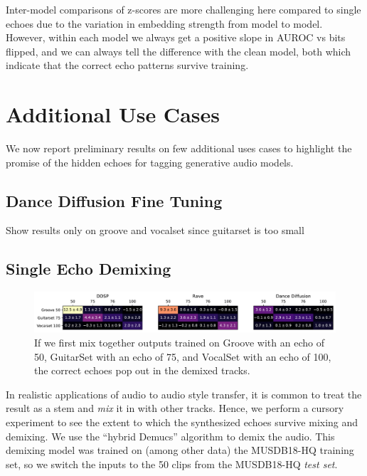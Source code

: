 \documentclass[letterpaper]{article} %
\begin{document}
Inter-model comparisons of z-scores are more challenging here compared to single echoes due to the variation in embedding strength from model to model.   However, within each model we always get a positive slope in AUROC vs bits flipped, and we can always tell the difference with the clean model, both which indicate that the correct echo patterns survive training.


\section{Additional Use Cases}

We now report preliminary results on few additional uses cases to highlight the promise of the hidden echoes for tagging generative audio models.



\subsection{Dance Diffusion Fine Tuning}

Show results only on groove and vocalset since guitarset is too small


\subsection{Single Echo Demixing}

\begin{figure}
    \centering
    \includegraphics[width=\textwidth]{figs/DemucsZScores.pdf}
    \caption{If we first mix together outputs trained on Groove with an echo of 50, GuitarSet with an echo of 75, and VocalSet with an echo of 100, the correct echoes pop out in the demixed tracks.}
    \label{fig:demucszscores}
\end{figure}

In realistic applications of audio to audio style transfer, it is common to treat the result as a stem and {\em mix} it in with other tracks.  Hence, we perform a cursory experiment to see the extent to which the synthesized echoes survive mixing and demixing.  We use the ``hybrid Demucs'' algorithm \cite{defossez2019music} to demix the audio.  This demixing model was trained on (among other data) the MUSDB18-HQ training set, so we switch the inputs to the 50 clips from the MUSDB18-HQ {\em test set}.  
\end{document}
